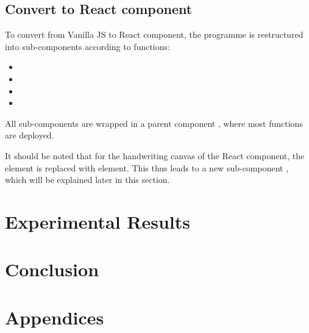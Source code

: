 \documentclass[12pt,twoside]{report}
\begin{document}
\section{Convert to React component}
\label{imp-react}
To convert from Vanilla JS to React component, the programme is restructured into sub-components according to functions:
\begin{itemize}
    \item {}
    \item {}
    \item {}
    \item {}
\end{itemize}

All sub-components are wrapped in a parent component ,
where most functions are deployed.

It should be noted that for the handwriting canvas of the React component, the
 element is replaced with  element. This thus leads to a
new sub-component , which will be explained later in this section.

\chapter{Experimental Results}
\label{Results}


\chapter{Conclusion}
\label{Conclusion}





\chapter{Appendices}
\label{Appendices}
\end{document}
